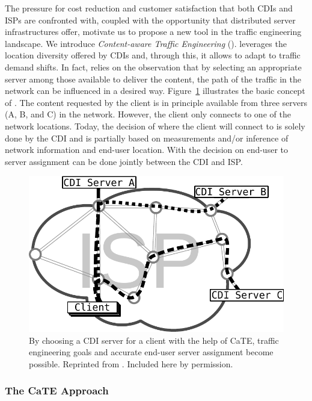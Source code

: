 The pressure for cost reduction and customer satisfaction that both CDIs and
ISPs are confronted with, coupled with the opportunity that distributed server
infrastructures offer, motivate us to propose a new tool in the traffic
engineering landscape. We introduce \emph{Content-aware Traffic Engineering}
(\cate). \cate leverages the location diversity offered by CDIs and, through
this, it allows to adapt to traffic demand shifts. In fact, \cate relies on the
observation that by selecting an appropriate server among those available to
deliver the content, the path of the traffic in the network can be influenced
in a desired way. Figure~\ref{fig:flowSelection} illustrates the basic concept
of \cate. The content requested by the client is in principle available from
three servers (A, B, and C) in the network. However, the client only connects
to one of the network locations. Today, the decision of where the client will
connect to is solely done by the CDI and is partially based on measurements
and/or inference of network information and end-user location. With \cate the
decision on end-user to server assignment can be done jointly between the CDI
and ISP.

\begin{figure}[tbp]
  \center\includegraphics[width=0.8\linewidth]{figures-pdf/trafficShift-concept}
  \caption{By choosing a CDI server for a client with the help of CaTE, traffic
  engineering goals and accurate end-user server assignment become
  possible. Reprinted from \cite{Cate-CCR}. Included here by permission.}
  \label{fig:flowSelection}
  \vspace{-1.5em}
\end{figure}


\subsubsection{The CaTE Approach}\label{sec:cate}

